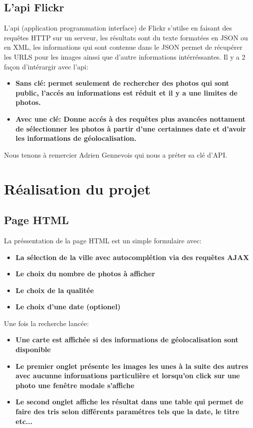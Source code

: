 \documentclass[a4paper, 11pt]{article}
\begin{document}
\subsection*{L'api Flickr}
L'api (application programmation interface) de Flickr s'utilse en faisant des requêtes HTTP sur un serveur, les résultats sont du texte formatées en JSON ou en XML, les informations qui sont contenue dans le JSON permet de récupérer les URLS pour les images ainssi que d'autre informations intérréssantes.
\newline
\newline
Il y a 2 façon d'intérargir avec l'api:
	\begin{itemize}
            \item \textbf{Sans clé: permet seulement de rechercher des photos qui sont public, l'accés au informations est réduit et il y a une limites de photos.}
            \item \textbf{Avec une clé: Donne accés à des requêtes plus avancées nottament de sélectionner les photos à partir d'une certainnes date et d'avoir les informations de géolocalisation.}
	\end{itemize}
\newline 
Nous tenons à remercier Adrien Gennevois qui nous a préter sa clé d'API.

\section*{Réalisation du projet}

	\subsection*{Page HTML }
        La préssentation de la page HTML est un simple formulaire avec:
        \newline
        \begin{itemize}
            \item \textbf{La sélection de la ville avec autocomplétion via des requêtes AJAX}
            \item \textbf{Le choix du nombre de photos à afficher}
            \item \textbf{Le choix de la qualitée}
            \item \textbf{Le choix d'une date (optionel)}
        \end{itemize}
        \newline
        Une fois la recherche lancée:
        \newline
	\begin{itemize}
            \item \textbf{Une carte est affichée si des informations de géolocalisation sont disponible}
            \item \textbf{Le premier onglet présente les images les unes à la suite des autres avec aucunne informations particulière et lorsqu'on click sur une photo une fenêtre modale s'affiche}
            \item \textbf{Le second onglet affiche les résultat dans une table qui permet de faire des tris selon différents paramétres tels que la date, le titre etc...}
	\end{itemize}
\end{document}
